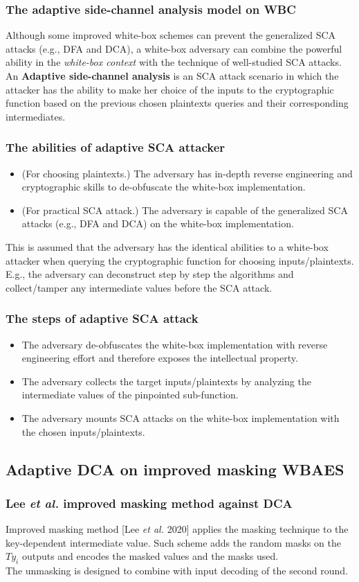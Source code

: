 \documentclass{beamer}
\begin{document}
\frame
{
	\frametitle{The adaptive side-channel analysis model on WBC}
	Although some improved white-box schemes can prevent the generalized SCA attacks (e.g., DFA and DCA), a white-box adversary can combine the powerful ability in the \textit{white-box context} with the technique of well-studied SCA attacks.
	\\[2ex]
	An \textbf{Adaptive side-channel analysis} is an SCA attack scenario in which the attacker has the ability
	to make her choice of the inputs to the cryptographic function based on the previous chosen plaintexts queries and their corresponding intermediates.
}

\frame
{
	\frametitle{The abilities of adaptive SCA attacker}
	\begin{itemize}
		\item (For choosing plaintexts.) The adversary has in-depth reverse engineering and cryptographic skills to de-obfuscate the white-box implementation.
		\item (For practical SCA attack.) The adversary is capable of the generalized SCA attacks (e.g., DFA and DCA) on the white-box implementation.
	\end{itemize}
	This is assumed that the adversary has the identical abilities to a white-box attacker when querying the cryptographic function for choosing inputs/plaintexts. E.g., the adversary can deconstruct step by step the algorithms and collect/tamper any intermediate values before the SCA attack.
}

\frame
{
	\frametitle{The steps of adaptive SCA attack}
	\begin{itemize}
		\item The adversary de-obfuscates the white-box implementation with reverse engineering effort and therefore exposes the intellectual property.
		\item The adversary collects the target inputs/plaintexts by analyzing the intermediate values of the pinpointed sub-function.
		\item The adversary mounts SCA attacks on the white-box implementation with the chosen inputs/plaintexts.
	\end{itemize}
}


\subsection{Adaptive DCA on improved masking WBAES}

\frame
{
	\frametitle{Lee \textit{et al.} improved masking method against DCA}
	Improved masking method [Lee \textit{et al.} 2020] applies the masking technique to the key-dependent intermediate value. Such scheme adds the random masks on the $Ty_i$ outputs and encodes the masked values and the masks used.
	\\[2ex]
	The unmasking is designed to combine with input decoding of the second round.
}
\end{document}
